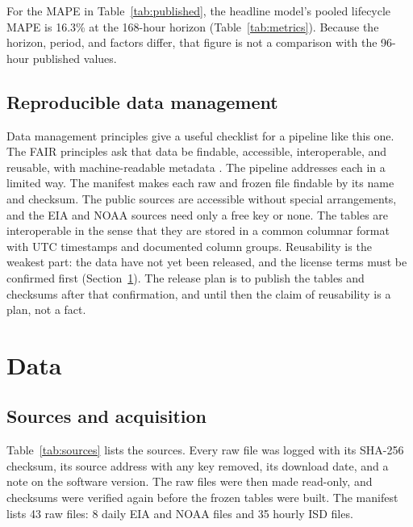 \documentclass[10pt,journal,compsoc]{IEEEtran}
\begin{document}
For the MAPE in Table~\ref{tab:published}, the headline model's pooled lifecycle MAPE is 16.3\% at the 168-hour horizon (Table~\ref{tab:metrics}). Because the horizon, period, and factors differ, that figure is not a comparison with the 96-hour published values.

\subsection{Reproducible data management}
Data management principles give a useful checklist for a pipeline like this one. The FAIR principles ask that data be findable, accessible, interoperable, and reusable, with machine-readable metadata \cite{wilkinson2016}. The pipeline addresses each in a limited way. The manifest makes each raw and frozen file findable by its name and checksum. The public sources are accessible without special arrangements, and the EIA and NOAA sources need only a free key or none. The tables are interoperable in the sense that they are stored in a common columnar format with UTC timestamps and documented column groups. Reusability is the weakest part: the data have not yet been released, and the license terms must be confirmed first (Section~\ref{sec:data}). The release plan is to publish the tables and checksums after that confirmation, and until then the claim of reusability is a plan, not a fact.

\section{Data}
\label{sec:data}

\subsection{Sources and acquisition}
Table~\ref{tab:sources} lists the sources. Every raw file was logged with its SHA-256 checksum, its source address with any key removed, its download date, and a note on the software version. The raw files were then made read-only, and checksums were verified again before the frozen tables were built. The manifest lists 43 raw files: 8 daily EIA and NOAA files and 35 hourly ISD files.
\end{document}
